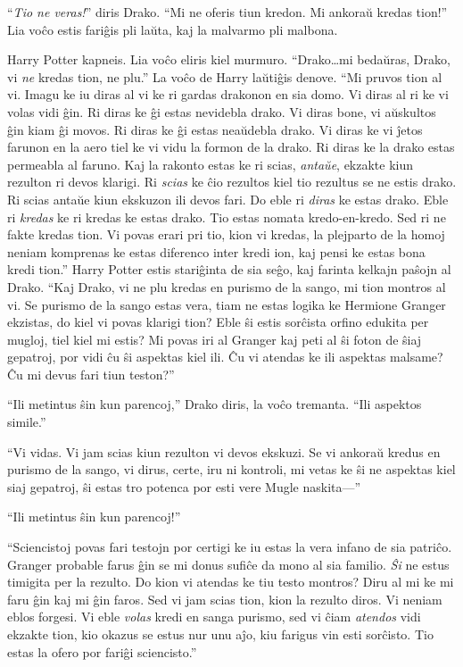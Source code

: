 ``\emph{Tio ne veras!}'' diris Drako. ``Mi ne oferis tiun kredon. Mi
ankoraŭ kredas tion!'' Lia voĉo estis fariĝis pli laŭta, kaj la
malvarmo pli malbona.

Harry Potter kapneis. Lia voĉo eliris kiel murmuro. ``Drako\ldots{}mi
bedaŭras, Drako, vi \emph{ne} kredas tion, ne plu.'' La voĉo de Harry
laŭtiĝis denove. ``Mi pruvos tion al vi. Imagu ke iu diras al vi ke ri
gardas drakonon en sia domo. Vi diras al ri ke vi volas vidi ĝin. Ri
diras ke ĝi estas nevidebla drako. Vi diras bone, vi aŭskultos ĝin
kiam ĝi movos. Ri diras ke ĝi estas neaŭdebla drako. Vi diras ke vi
ĵetos farunon en la aero tiel ke vi vidu la formon de la drako. Ri
diras ke la drako estas permeabla al faruno. Kaj la rakonto estas ke
ri scias, \emph{antaŭe}, ekzakte kiun rezulton ri devos klarigi. Ri
\emph{scias} ke ĉio rezultos kiel tio rezultus se ne estis drako. Ri
scias antaŭe kiun ekskuzon ili devos fari. Do eble ri \emph{diras} ke
estas drako. Eble ri \emph{kredas} ke ri kredas ke estas drako. Tio
estas nomata kredo-en-kredo. Sed ri ne fakte kredas tion. Vi povas
erari pri tio, kion vi kredas, la plejparto de la homoj neniam
komprenas ke estas diferenco inter kredi ion, kaj pensi ke estas bona
kredi tion.'' Harry Potter estis stariĝinta de sia seĝo, kaj farinta
kelkajn paŝojn al Drako. ``Kaj Drako, vi ne plu kredas en purismo de
la sango, mi tion montros al vi. Se purismo de la sango estas vera,
tiam ne estas logika ke Hermione Granger ekzistas, do kiel vi povas
klarigi tion? Eble ŝi estis sorĉista orfino edukita per mugloj, tiel
kiel mi estis? Mi povas iri al Granger kaj peti al ŝi foton de ŝiaj
gepatroj, por vidi ĉu ŝi aspektas kiel ili. Ĉu vi atendas ke ili
aspektas malsame? Ĉu mi devus fari tiun teston?''

``Ili metintus ŝin kun parencoj,'' Drako diris, la voĉo tremanta. ``Ili aspektos simile.''

``Vi vidas. Vi jam scias kiun rezulton vi devos ekskuzi. Se vi ankoraŭ
kredus en purismo de la sango, vi dirus, certe, iru ni kontroli, mi
vetas ke ŝi ne aspektas kiel siaj gepatroj, ŝi estas tro potenca por
esti vere Mugle naskita—''

``Ili metintus ŝin kun parencoj!''

``Sciencistoj povas fari testojn por certigi ke iu estas la vera
infano de sia patriĉo. Granger probable farus ĝin se mi donus sufiĉe
da mono al sia familio. \emph{Ŝi} ne estus timigita per la rezulto. Do
kion vi atendas ke tiu testo montros? Diru al mi ke mi faru ĝin kaj mi
ĝin faros. Sed vi jam scias tion, kion la rezulto diros. Vi neniam
eblos forgesi. Vi eble \emph{volas} kredi en sanga purismo, sed vi
ĉiam \emph{atendos} vidi ekzakte tion, kio okazus se estus nur unu
aĵo, kiu farigus vin esti sorĉisto. Tio estas la ofero por fariĝi
sciencisto.''

